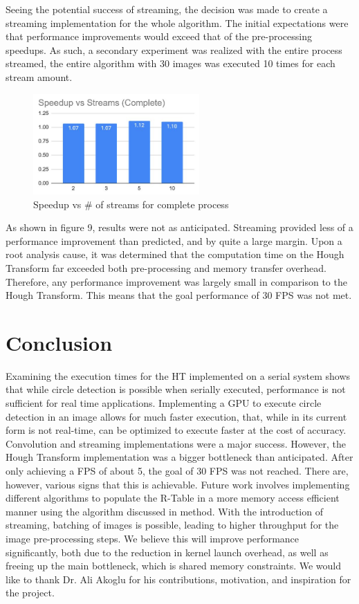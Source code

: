 \documentclass[conference]{IEEEtran}
\begin{document}
Seeing the potential success of streaming, the decision was made to create a streaming implementation for the whole algorithm. The initial expectations were that performance improvements would exceed that of the pre-processing speedups. As such, a secondary experiment was realized with the entire process streamed, the entire algorithm with 30 images was executed 10 times for each stream amount.

\begin{figure}[H]
\centering
\includegraphics[width=2.5in]{images/StreamsComplete}\caption{Speedup vs \# of streams for complete process}\label{figure:streamComplete}
\end{figure}

As shown in figure 9, results were not as anticipated. Streaming provided less of a performance improvement than predicted, and by quite a large margin. Upon a root analysis cause, it was determined that the computation time on the Hough Transform far exceeded both pre-processing and memory transfer overhead. Therefore, any performance improvement was largely small in comparison to the Hough Transform. This means that the goal performance of 30 FPS was not met.

\section{Conclusion}
Examining the execution times for the HT implemented on a serial system shows that while circle detection is possible when serially executed, performance is not sufficient for real time applications.
Implementing a GPU to execute circle detection in an image allows for much faster execution, that, while in its current form is not real-time, can be optimized to execute faster at the cost of accuracy. Convolution and streaming implementations were a major success. However, the Hough Transform implementation was a bigger bottleneck than anticipated. After only achieving a FPS of about 5, the goal of 30 FPS was not reached. There are, however, various signs that this is achievable.
Future work involves implementing different algorithms to populate the R-Table in a more memory access efficient manner using the algorithm discussed in method. 
With the introduction of streaming, batching of images is possible, leading to higher throughput for the image pre-processing steps. We believe this will improve performance significantly, both due to the reduction in kernel launch overhead, as well as freeing up the main bottleneck, which is shared memory constraints.
We would like to thank Dr. Ali Akoglu for his contributions, motivation, and inspiration for the project.




\end{document}
